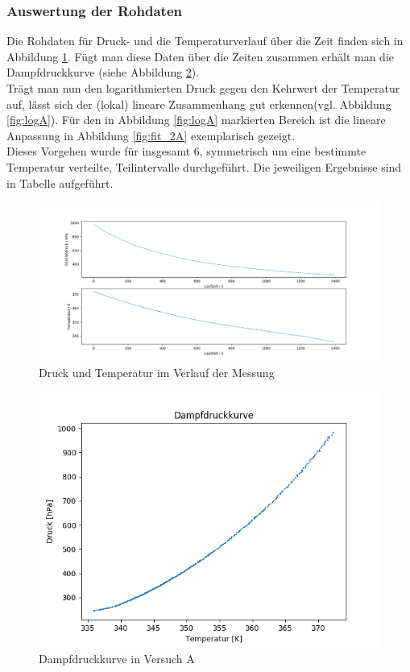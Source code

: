 \documentclass[12pt,a4paper]{article}
\begin{document}
\subsubsection{Auswertung der Rohdaten}
Die Rohdaten für Druck- und die Temperaturverlauf über die Zeit finden sich in Abbildung \ref{fig:RohdatenA}. Fügt man diese Daten über die Zeiten zusammen erhält man die Dampfdruckkurve (siehe Abbildung \ref{fig:DampfA}).\\
Trägt man nun den logarithmierten Druck gegen den Kehrwert der Temperatur auf, lässt sich der (lokal) lineare Zusammenhang gut erkennen(vgl. Abbildung \ref{fig:logA}). Für den in Abbildung \ref{fig:logA} markierten Bereich ist die lineare Anpassung in Abbildung \ref{fig:fit_2A} exemplarisch gezeigt.\\
Dieses Vorgehen wurde für insgesamt 6, symmetrisch um eine bestimmte Temperatur verteilte, Teilintervalle durchgeführt. Die jeweiligen Ergebnisse sind in Tabelle %
aufgeführt.

\begin{figure}
\includegraphics[width=\linewidth]{Bilder/Rohdaten_HauptmessungA.png}
\caption[Dichtigkeit vor Hauptversuch Apparatur A]{Druck und Temperatur im Verlauf der Messung}
\label{fig:RohdatenA}
\end{figure}

\begin{figure}
\includegraphics[width=\linewidth]{Bilder/DampfdruckkurveA.png}
\caption[]{Dampfdruckkurve in Versuch A}
\label{fig:DampfA}
\end{figure}
\end{document}
